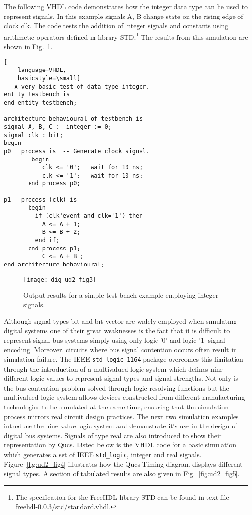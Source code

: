 
The following VHDL code demonstrates how the integer data type can be used to represent signals.   In this example signals A, B  change state on the rising edge of clock clk. The code tests the addition of integer signals and constants using arithmetic operators defined in library STD.\footnote{The specification for the FreeHDL library STD can be found in text file freehdl-0.0.3/std/standard.vhdl.} The results from this simulation are shown in Fig.~\ref{fig:ud2_fig3}.

\begin{lstlisting}[
    language=VHDL,
    basicstyle=\small]
-- A very basic test of data type integer.
entity testbench is
end entity testbench;
--
architecture behavioural of testbench is
signal A, B, C :  integer := 0;
signal clk : bit;
begin
p0 : process is  -- Generate clock signal.
        begin
           clk <= '0';   wait for 10 ns;
           clk <= '1';   wait for 10 ns;
       end process p0;
--
p1 : process (clk) is
       begin
         if (clk'event and clk='1') then
           A <= A + 1;
           B <= B + 2;
         end if;
       end process p1;
           C <= A + B ;
end architecture behavioural;
 \end{lstlisting}

\begin{figure}[ht] 
  \centering 
  \texttt{[image: dig\_ud2\_fig3]} 
  \caption{Output results for a simple test bench example employing integer signals.} 
  \label{fig:ud2_fig3} 
\end{figure} 


Although signal types bit and bit-vector are widely employed when simulating digital systems one of their great weaknesses is the fact that it is difficult to represent signal bus systems simply using only logic '0' and logic '1' signal encoding.  Moreover, circuits where bus signal contention occurs often result in simulation failure.  The IEEE \verb|std_logic_1164| package overcomes this limitation through the introduction of a multivalued logic system which defines nine different logic values to represent signal types and signal strengths.  Not only is the bus contention problem solved through logic resolving functions but the multivalued logic system allows devices constructed from different manufacturing technologies to be simulated at the same time, ensuring that the simulation process mirrors real circuit design practices.  The next two simulation examples introduce the nine value logic system and demonstrate it's use in the design of digital bus systems. Signals of type real are also introduced to show their representation by Qucs. Listed below is the VHDL code for a basic simulation which generates a set of IEEE \verb|std_logic|, integer and real signals.  Figure~\ref{fig:ud2_fig4} illustrates how the Qucs Timing diagram displays different signal types.  A section of tabulated results are also given in Fig.~\ref{fig:ud2_fig5}.

